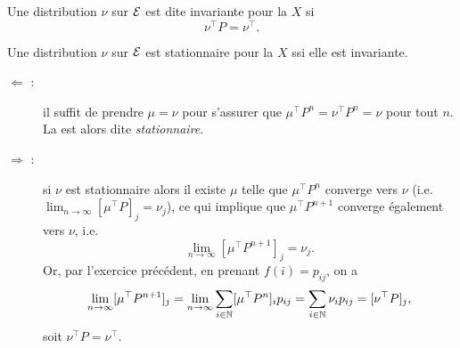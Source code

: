 \begin{definition*}
  Une distribution $\nu$ sur $\mathcal{E}$ est dite invariante pour la \cM $X$ si 
  $$
  \nu^\top P = \nu^\top.
  $$
\end{definition*}

\begin{proposition*}
  Une distribution $\nu$ sur $\mathcal{E}$ est stationnaire pour la \cM $X$ ssi elle est invariante.
\end{proposition*}

\proof
\begin{description}
  \item[$\Leftarrow$ :] il suffit de prendre $\mu = \nu$ pour s'assurer que $\mu^\top P^n = \nu^\top P^n = \nu$ pour tout $n$. La \cM est alors dite {\em stationnaire}.
  \item[$\Rightarrow$ :] si $\nu$ est stationnaire alors il existe $\mu$ telle que $\mu^\top P^n$ converge vers $\nu$ (i.e. $\lim_{n \rightarrow \infty} [\mu^\top P]_j = \nu_j$), ce qui implique que $\mu^\top P^{n+1}$ converge également vers $\nu$, i.e.
  $$
  \lim_{n \rightarrow \infty} [\mu^\top P^{n+1}]_j = \nu_j.
  $$
  Or, par l'exercice précédent, en prenant $f(i) = p_{ij}$, on a
  $$
  \lim_{n \rightarrow \infty} [\mu^\top P^{n+1}]_j
  = \lim_{n \rightarrow \infty} \sum_{i \in \mathbb{N}} [\mu^\top P^n]_i p_{ij}
  = \sum_{i \in \mathbb{N}} \nu_i p_{ij}
  = [\nu^\top P]_j,
  $$
  soit $\nu^\top P = \nu^\top$.
\end{description}
\eproof


